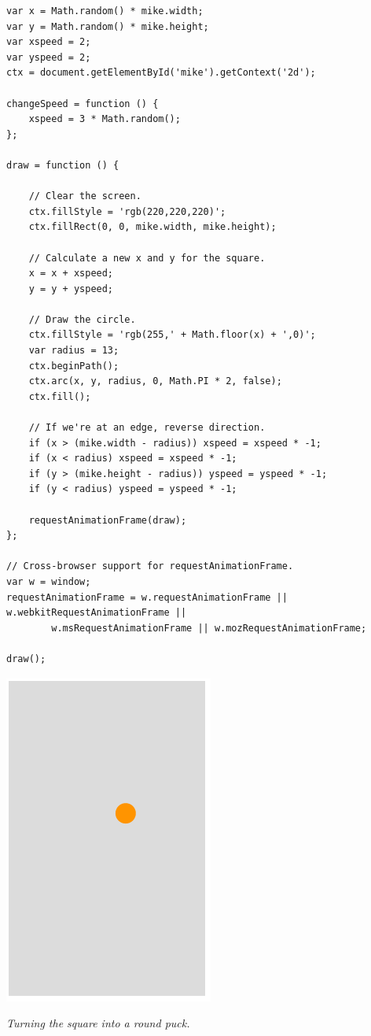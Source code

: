 \documentclass[11pt]{article}
\newcommand{\capt}[1]{\begin{minipage}{0.75\columnwidth}\itshape#1\end{minipage}}
\begin{document}
\begin{verbatim}
var x = Math.random() * mike.width;
var y = Math.random() * mike.height;
var xspeed = 2;
var yspeed = 2;
ctx = document.getElementById('mike').getContext('2d');

changeSpeed = function () {
    xspeed = 3 * Math.random();
};

draw = function () {

    // Clear the screen.
    ctx.fillStyle = 'rgb(220,220,220)';
    ctx.fillRect(0, 0, mike.width, mike.height);

    // Calculate a new x and y for the square.
    x = x + xspeed;
    y = y + yspeed;

    // Draw the circle.
    ctx.fillStyle = 'rgb(255,' + Math.floor(x) + ',0)';
    var radius = 13;
    ctx.beginPath();
    ctx.arc(x, y, radius, 0, Math.PI * 2, false);
    ctx.fill();

    // If we're at an edge, reverse direction.
    if (x > (mike.width - radius)) xspeed = xspeed * -1;
    if (x < radius) xspeed = xspeed * -1;
    if (y > (mike.height - radius)) yspeed = yspeed * -1;
    if (y < radius) yspeed = yspeed * -1;

    requestAnimationFrame(draw);
};

// Cross-browser support for requestAnimationFrame.
var w = window;
requestAnimationFrame = w.requestAnimationFrame || w.webkitRequestAnimationFrame ||
        w.msRequestAnimationFrame || w.mozRequestAnimationFrame;

draw();
\end{verbatim}

\begin{center}
\includegraphics[width=0.5\columnwidth]{game-ball.png}

\capt{Turning the square into a round puck.}
\end{center}
\end{document}
